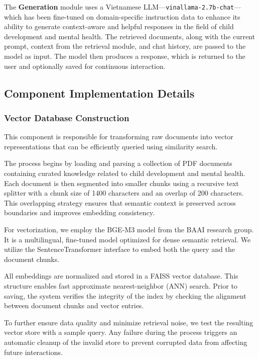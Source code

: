 \documentclass[conference]{IEEEtran}
\begin{document}
The \textbf{Generation} module uses a Vietnamese LLM—\texttt{vinallama-2.7b-chat}—which has been fine-tuned on domain-specific instruction data to enhance its ability to generate context-aware and helpful responses in the field of child development and mental health. The retrieved documents, along with the current prompt, context from the retrieval module, and chat history, are passed to the model as input. The model then produces a response, which is returned to the user and optionally saved for continuous interaction.
    
\subsection{Component Implementation Details}
\label{sec:Component Implementation Details}
\subsubsection{Vector Database Construction}
\label{sec:Vector Database Construction}

This component is responsible for transforming raw documents into vector representations that can be efficiently queried using similarity search.


The process begins by loading and parsing a collection of PDF documents containing curated knowledge related to child development and mental health. Each document is then segmented into smaller chunks using a recursive text splitter with a chunk size of 1400 characters and an overlap of 200 characters. This overlapping strategy ensures that semantic context is preserved across boundaries and improves embedding consistency.

For vectorization, we employ the BGE-M3 model from the BAAI research group. It is a multilingual, fine-tuned model optimized for dense semantic retrieval. We utilize the SentenceTransformer interface to embed both the query and the document chunks.

All embeddings are normalized and stored in a FAISS vector database. This structure enables fast approximate nearest-neighbor (ANN) search. Prior to saving, the system verifies the integrity of the index by checking the alignment between document chunks and vector entries.

To further ensure data quality and minimize retrieval noise, we test the resulting vector store with a sample query. Any failure during the process triggers an automatic cleanup of the invalid store to prevent corrupted data from affecting future interactions.
\end{document}
